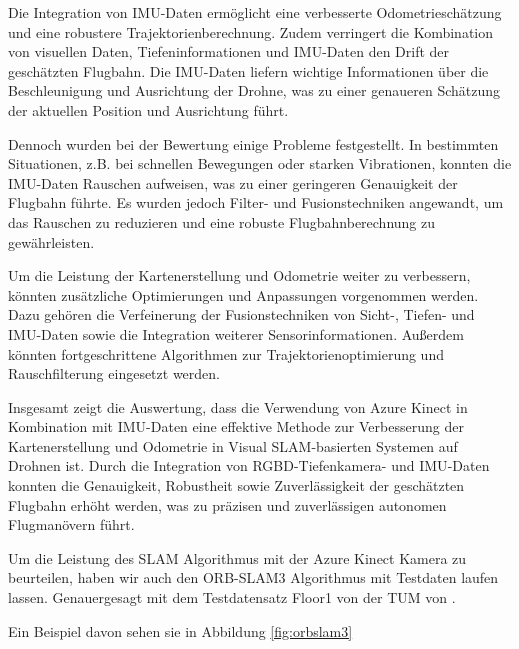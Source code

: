 Die Integration von \ac{IMU}-Daten ermöglicht eine verbesserte Odometrieschätzung und eine robustere Trajektorienberechnung. Zudem verringert die Kombination von visuellen Daten, Tiefeninformationen und IMU-Daten den Drift der geschätzten Flugbahn. Die \ac{IMU}-Daten liefern wichtige Informationen über die Beschleunigung und Ausrichtung der Drohne, was zu einer genaueren Schätzung der aktuellen Position und Ausrichtung führt.

Dennoch wurden bei der Bewertung einige Probleme festgestellt. In bestimmten Situationen, z.B. bei schnellen Bewegungen oder starken Vibrationen, konnten die \ac{IMU}-Daten Rauschen aufweisen, was zu einer geringeren Genauigkeit der Flugbahn führte. Es wurden jedoch Filter- und Fusionstechniken angewandt, um das Rauschen zu reduzieren und eine robuste Flugbahnberechnung zu gewährleisten.

Um die Leistung der Kartenerstellung und Odometrie weiter zu verbessern, könnten zusätzliche Optimierungen und Anpassungen vorgenommen werden. Dazu gehören die Verfeinerung der Fusionstechniken von Sicht-, Tiefen- und IMU-Daten sowie die Integration weiterer Sensorinformationen. Außerdem könnten fortgeschrittene Algorithmen zur Trajektorienoptimierung und Rauschfilterung eingesetzt werden.

Insgesamt zeigt die Auswertung, dass die Verwendung von Azure Kinect in Kombination mit \ac{IMU}-Daten eine effektive Methode zur Verbesserung der Kartenerstellung und Odometrie in Visual SLAM-basierten Systemen auf Drohnen ist. Durch die Integration von RGBD-Tiefenkamera- und \ac{IMU}-Daten konnten die Genauigkeit, Robustheit sowie Zuverlässigkeit der geschätzten Flugbahn erhöht werden, was zu präzisen und zuverlässigen autonomen Flugmanövern führt.

Um die Leistung des \ac{SLAM} Algorithmus mit der Azure Kinect Kamera zu beurteilen, haben wir auch den ORB-SLAM3 Algorithmus mit Testdaten laufen lassen. Genauergesagt mit dem Testdatensatz Floor1 von der \ac{TUM} von \cite{tum_data}.

Ein Beispiel davon sehen sie in Abbildung \ref{fig:orbslam3}

